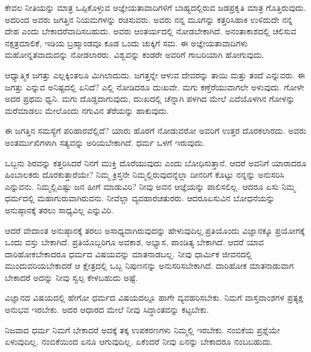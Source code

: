 \vskip 3pt

ಕೇವಲ ನೀತಿಯನ್ನು ಮಾತ್ರ ಒಪ್ಪಿಕೊಳ್ಳುವ ಅಜ್ಞೇಯತಾವಾದಿಗಳಿಗೆ ಬಾಹ್ಯದಲ್ಲಿರುವ ಜಡಪ್ರಕೃತಿ ಮಾತ್ರ ಗೊತ್ತಿರುವುದು. ಅದರಿಂದ ಅವರು ಜಗತ್ತಿನ ನಿಯಮಗಳನ್ನು ರಚಿಸುವರು. ಅವರು ನನ್ನ ಮೂಗನ್ನು ಕತ್ತರಿಸಿಹಾಕಿ ಉಳಿದುದೇ ನನ್ನ ದೇಹ ಎಂದು ಬೇಕಾದರೆ\break ವಾದಿಸಬಹುದು. ಅವರು ಆಂತರ್ಯದಲ್ಲಿ ನೋಡಬೇಕಾಗಿದೆ. ಅನಂತಾಕಾಶದಲ್ಲಿ ಚಲಿಸುವ ನಕ್ಷತ್ರಮಾಲಿಕೆ, ಇಡಿಯ ಬ್ರಹ್ಮಾಂಡವೂ ಕೂಡ ಒಂದು ಚುಕ್ಕಿಗೆ ಸಮ. ಈ ಅಜ್ಞೇಯತಾವಾದಿಗಳು ಮಹೋನ್ನತವಾದುದನ್ನು ನೋಡಲಾರರು. ವಿಶ್ವವನ್ನು ಕಂಡರೇ ಅವರಿಗೆ ಗಾಬರಿಯಾಗಿ ಹೋಗುವುದು.

\vskip 3pt

ಆಧ್ಯಾತ್ಮಿಕ ಜಗತ್ತು ಎಲ್ಲಕ್ಕಿಂತಲೂ ಮಿಗಿಲಾದುದು. ಜಗತ್ತನ್ನೇ ಆಳುವ ದೇವರನ್ನು ತಾಯಿ ಮತ್ತು ತಂದೆ ಎನ್ನುವರು. ಈ ಜಗತ್ತು ಎನ್ನುವ ಅನಿಷ್ಟದಲ್ಲಿ ಏನಿದೆ? ಎಲ್ಲಿ ನೋಡಿದರೂ ದುಃಖವೇ. ಮಗು ಕಣ್ತೆರೆಯುವಾಗಲೇ ಅಳುವುದು. ಗೋಳೇ ಅದರ ಪ್ರಥಮ ಧ್ವನಿ. ಮಗು ದೊಡ್ಡದಾಗುವುದು, ದುಃಖದಲ್ಲಿ ಚೆನ್ನಾಗಿ ಪಳಗಿದ ಮೇಲೆ ಎದೆಯೊಳಗಿನ ಗೋಳನ್ನು ಮರೆಮಾಡಲು ಮೇಲೊಂದು ನಗುವಿನ ತೆರೆಯನ್ನು ಹಾಕುವುದು.

\vskip 3pt

ಈ ಜಗತ್ತಿನ ಸಮಸ್ಯೆಗೆ ಪರಿಹಾರವೆಲ್ಲಿದೆ? ಯಾರು ಹೊರಗೆ ನೋಡುವರೋ ಅವರಿಗೆ ಉತ್ತರ ದೊರಕಲಾರದು. ಅವರು ಅಂತರ್ಮುಖಿಗಳಾಗಿ ಸತ್ಯವನ್ನು ಅರಿಯಬೇಕಾಗಿದೆ. ಧರ್ಮ ಒಳಗೆ ಇರುವುದು.

\vskip 3pt

ಒಬ್ಬನು ಶಿರವನ್ನು ಕತ್ತರಿಸಿದರೆ ನಿನಗೆ ಮುಕ್ತಿ ದೊರೆಯುವುದು ಎಂದು ಬೋಧಿಸುತ್ತಾನೆ. ಆದರೆ ಅವನಿಗೆ ಯಾರಾದರೂ ಹಿಂಬಾಲಕರು ದೊರಕುತ್ತಾರೆಯೇ? ನಿಮ್ಮ ಕ್ರಿಸ್ತನೇ ನಿಮ್ಮಲ್ಲಿರುವುದನ್ನೆಲ್ಲಾ ದೀನರಿಗೆ ಕೊಟ್ಟು ನನ್ನನ್ನು ಅನುಸರಿಸಿ ಎನ್ನುವನು. ನಿಮ್ಮಲ್ಲಿ\break ಎಷ್ಟು ಜನ ಹೀಗೆ ಮಾಡುವಿರಿ? ನೀವು ಅವನ ಆಜ್ಞೆಯನ್ನು ಪಾಲಿಸಲಿಲ್ಲ. ಆದರೂ ಏಸು ನಿಮ್ಮ ಧರ್ಮದಲ್ಲಿ ಮಹಾಗುರುವಾಗಿರುವನು. ನೀವೆಲ್ಲಾ ವ್ಯವಹಾರಚತುರರು. ಆದರೂ\break ಏಸುವಿನ ಬೋಧನೆಯನ್ನು ಅನುಷ್ಠಾನಕ್ಕೆ ತರಲು ಸಾಧ್ಯವಿಲ್ಲ ಎನ್ನುವಿರಿ.

\vskip 3pt

ಆದರೆ ವೇದಾಂತ ಅನುಷ್ಠಾನಕ್ಕೆ ತರಲು ಅಸಾಧ್ಯವಾಗಿರುವುದನ್ನು ಹೇಳುವುದಿಲ್ಲ.\break ಪ್ರತಿಯೊಂದು ವಿಜ್ಞಾನಕ್ಕೂ ಪ್ರಯೋಗಕ್ಕೆ ಒಂದು ವಸ್ತು ಬೇಕಾಗಿದೆ. ಪ್ರತಿಯೊಬ್ಬರಿಗೂ ಅವಕಾಶ, ಅಭ್ಯಾಸ, ಪಾಂಡಿತ್ಯ ಬೇಕಾಗಿದೆ. ಆದರೆ ಯಾವ ದಾರಿಹೋಕಬೇಕಾದರೂ ಧರ್ಮದ ವಿಷಯವನ್ನು ಮಾತನಾಡಬಲ್ಲ. ನೀವು ಧಾರ್ಮಿಕ ಜೀವನದಲ್ಲಿ ಮುಂದುವರಿಯಬೇಕಾದರೆ ಆ ಕ್ಷೇತ್ರದಲ್ಲಿ ಒಬ್ಬ ನಿಪುಣನನ್ನು ಅನುಸರಿಸಬೇಕಾಗಿದೆ. ದಾರಿಹೋಕ ಮಾತನಾಡುವಾಗ ಬೇಕಾದರೆ ಅದನ್ನು ನೀವು ಸ್ವಲ್ಪ ಕೇಳಬಹುದು ಅಷ್ಟೆ.

\vskip 3pt

ವಿಜ್ಞಾನದ ವಿಷಯದಲ್ಲಿ ಹೇಗೋ ಧರ್ಮದ ವಿಷಯದಲ್ಲೂ ಹಾಗೇ ವ್ಯವಹರಿಸಬೇಕು. ನಿಮಗೆ ವಾಸ್ತವಾಂಶಗಳ ಪ್ರತ್ಯಕ್ಷ ಅನುಭವ ಇರಬೇಕು. ಅದರ ಆಧಾರದ ಮೇಲೆ ನೀವು ಸಿದ್ಧಾಂತವನ್ನು ಕಟ್ಟಬೇಕು.

\vskip 4pt

ನಿಜವಾದ ಧರ್ಮ ನಿಮಗೆ ಬೇಕಾದರೆ ಅದಕ್ಕೆ ತಕ್ಕ ಉಪಕರಣಗಳು ನಿಮ್ಮಲ್ಲಿ ಇರಬೇಕು. ನಂಬಿಕೆಯ ಪ್ರಶ್ನೆಯೇ ಏಳುವುದಿಲ್ಲ. ನಂಬಿಕೆಯಿಂದ ಏನೂ ಆಗುವುದಿಲ್ಲ. ಏಕೆಂದರೆ ನೀವು ಏನನ್ನು ಬೇಕಾದರೂ ನಂಬಬಹುದು.

\vskip 4pt


